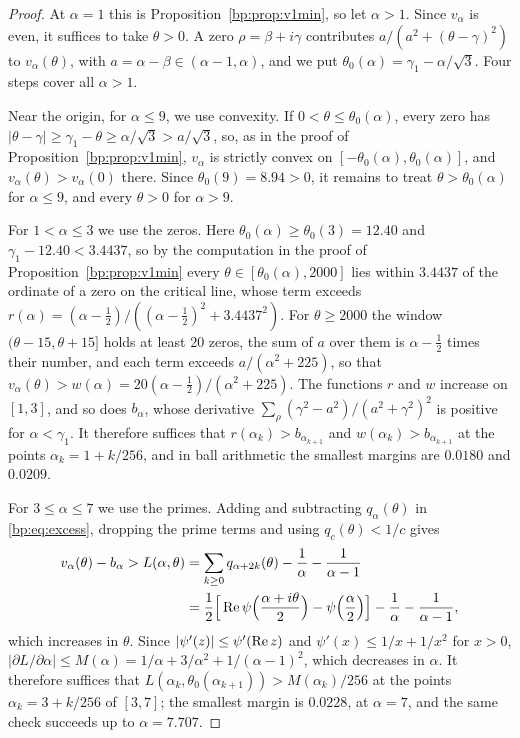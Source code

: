 \begin{proof}
At $\alpha=1$ this is Proposition~\ref{bp:prop:v1min}, so let $\alpha>1$. Since $v_\alpha$ is even, it suffices to take $\theta>0$. A zero $\rho=\beta+i\gamma$ contributes $a/(a^2+(\theta-\gamma)^2)$ to $v_\alpha(\theta)$, with $a=\alpha-\beta\in(\alpha-1,\alpha)$, and we put $\theta_0(\alpha)=\gamma_1-\alpha/\sqrt3$. Four steps cover all $\alpha>1$.

Near the origin, for $\alpha\le9$, we use convexity. If $0<\theta\le\theta_0(\alpha)$, every zero has $|\theta-\gamma|\ge\gamma_1-\theta\ge\alpha/\sqrt3>a/\sqrt3$, so, as in the proof of Proposition~\ref{bp:prop:v1min}, $v_\alpha$ is strictly convex on $[-\theta_0(\alpha),\theta_0(\alpha)]$, and $v_\alpha(\theta)>v_\alpha(0)$ there. Since $\theta_0(9)=8.94>0$, it remains to treat $\theta>\theta_0(\alpha)$ for $\alpha\le9$, and every $\theta>0$ for $\alpha>9$.

For $1<\alpha\le3$ we use the zeros. Here $\theta_0(\alpha)\ge\theta_0(3)=12.40$ and $\gamma_1-12.40<3.4437$, so by the computation in the proof of Proposition~\ref{bp:prop:v1min} every $\theta\in[\theta_0(\alpha),2000]$ lies within $3.4437$ of the ordinate of a zero on the critical line, whose term exceeds $r(\alpha)=(\alpha-\frac12)/((\alpha-\frac12)^2+3.4437^2)$. For $\theta\ge2000$ the window $(\theta-15,\theta+15]$ holds at least $20$ zeros, the sum of $a$ over them is $\alpha-\frac12$ times their number, and each term exceeds $a/(\alpha^2+225)$, so that $v_\alpha(\theta)>w(\alpha)=20(\alpha-\frac12)/(\alpha^2+225)$. The functions $r$ and $w$ increase on $[1,3]$, and so does $b_\alpha$, whose derivative $\sum_\rho(\gamma^2-a^2)/(a^2+\gamma^2)^2$ is positive for $\alpha<\gamma_1$. It therefore suffices that $r(\alpha_k)>b_{\alpha_{k+1}}$ and $w(\alpha_k)>b_{\alpha_{k+1}}$ at the points $\alpha_k=1+k/256$, and in ball arithmetic the smallest margins are $0.0180$ and $0.0209$.

For $3\le\alpha\le7$ we use the primes. Adding and subtracting $q_\alpha(\theta)$ in \eqref{bp:eq:excess}, dropping the prime terms and using $q_c(\theta)<1/c$ gives
\begin{align*}
v_\alpha(\theta)-b_\alpha>L(\alpha,\theta)&=\sum_{k\ge0}q_{\alpha+2k}(\theta)-\frac1\alpha-\frac1{\alpha-1}\\
&=\frac12\Big[\operatorname{Re}\psi\Big(\frac{\alpha+i\theta}2\Big)-\psi\Big(\frac\alpha2\Big)\Big]-\frac1\alpha-\frac1{\alpha-1},
\end{align*}
which increases in $\theta$. Since $|\psi'(z)|\le\psi'(\operatorname{Re} z)$ and $\psi'(x)\le1/x+1/x^2$ for $x>0$, $|\partial L/\partial\alpha|\le M(\alpha)=1/\alpha+3/\alpha^2+1/(\alpha-1)^2$, which decreases in $\alpha$. It therefore suffices that $L(\alpha_k,\theta_0(\alpha_{k+1}))>M(\alpha_k)/256$ at the points $\alpha_k=3+k/256$ of $[3,7]$; the smallest margin is $0.0228$, at $\alpha=7$, and the same check succeeds up to $\alpha=7.707$.


\end{proof}
